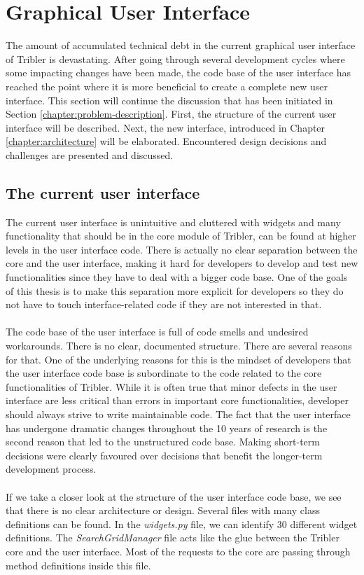 \section{Graphical User Interface}
The amount of accumulated technical debt in the current graphical user interface of Tribler is devastating. After going through several development cycles where some impacting changes have been made, the code base of the user interface has reached the point where it is more beneficial to create a complete new user interface. This section will continue the discussion that has been initiated in Section \ref{chapter:problem-description}. First, the structure of the current user interface will be described. Next, the new interface, introduced in Chapter \ref{chapter:architecture} will be elaborated. Encountered design decisions and challenges are presented and discussed.

\subsection{The current user interface}
 The current user interface is unintuitive and cluttered with widgets and many functionality that should be in the core module of Tribler, can be found at higher levels in the user interface code. There is actually no clear separation between the core and the user interface, making it hard for developers to develop and test new functionalities since they have to deal with a bigger code base. One of the goals of this thesis is to make this separation more explicit for developers so they do not have to touch interface-related code if they are not interested in that.\\\\
The code base of the user interface is full of code smells and undesired workarounds. There is no clear, documented structure. There are several reasons for that. One of the underlying reasons for this is the mindset of developers that the user interface code base is subordinate to the code related to the core functionalities of Tribler. While it is often true that minor defects in the user interface are less critical than errors in important core functionalities, developer should always strive to write maintainable code. The fact that the user interface has undergone dramatic changes throughout the 10 years of research is the second reason that led to the unstructured code base. Making short-term decisions were clearly favoured over decisions that benefit the longer-term development process.\\\\
If we take a closer look at the structure of the user interface code base, we see that there is no clear architecture or design. Several files with many class definitions can be found. In the \emph{widgets.py} file, we can identify 30 different widget definitions. The \emph{SearchGridManager} file acts like the glue between the Tribler core and the user interface. Most of the requests to the core are passing through method definitions inside this file.

